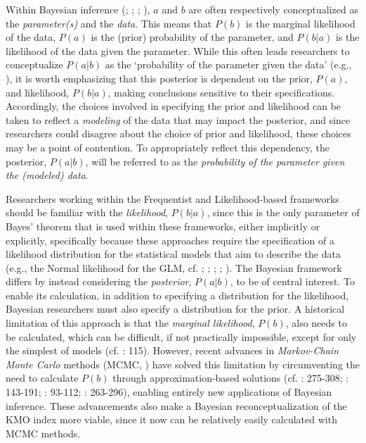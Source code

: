 \documentclass[
  10pt,
  a4paper,
  twoside]{article}
\begin{document}
Within Bayesian inference (; ; ; ), \(a\) and \(b\) are often respectively conceptualized as the \emph{parameter(s)} and the \emph{data}. This means that \(P(b)\) is the marginal likelihood of the data, \(P(a)\) is the (prior) probability of the parameter, and \(P(b | a)\) is the likelihood of the data given the parameter. While this often leads researchers to conceptualize \(P(a | b)\) as the `probability of the parameter given the data' (e.g., ), it is worth emphasizing that this posterior is dependent on the prior, \(P(a)\), and likelihood, \(P(b | a)\), making conclusions sensitive to their specifications. Accordingly, the choices involved in specifying the prior and likelihood can be taken to reflect a \emph{modeling} of the data that may impact the posterior, and since researchers could disagree about the choice of prior and likelihood, these choices may be a point of contention. To appropriately reflect this dependency, the posterior, \(P(a | b)\), will be referred to as the \emph{probability of the parameter given the (modeled) data}.

Researchers working within the Frequentist and Likelihood-based frameworks should be familiar with the \emph{likelihood}, \(P(b | a)\), since this is the only parameter of Bayes' theorem that is used within these frameworks, either implicitly or explicitly, specifically because these approaches require the specification of a likelihood distribution for the statistical models that aim to describe the data (e.g., the Normal likelihood for the GLM, cf. ; ; ; ; ). The Bayesian framework differs by instead considering the \emph{posterior}, \(P(a | b)\), to be of central interest. To enable its calculation, in addition to specifying a distribution for the likelihood, Bayesian researchers must also specify a distribution for the prior. A historical limitation of this approach is that the \emph{marginal likelihood}, \(P(b)\), also needs to be calculated, which can be difficult, if not practically impossible, except for only the simplest of models (cf. : 115). However, recent advances in \emph{Markov-Chain Monte Carlo} methods (MCMC, ) have solved this limitation by circumventing the need to calculate \(P(b)\) through approximation-based solutions (cf. : 275-308; : 143-191; : 93-112; : 263-296), enabling entirely new applications of Bayesian inference. These advancements also make a Bayesian reconceptualization of the KMO index more viable, since it now can be relatively easily calculated with MCMC methods.
\end{document}
